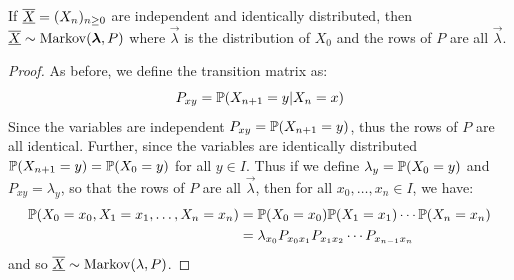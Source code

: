 \documentclass[../main.tex]{subfiles}
\begin{document}
\begin{corollary}
  If $\mchain{X} = (X_n)_{n \geq 0}$ are independent and identically distributed, then $\mchain{X} \sim \markov(\vec{\lambda}, P)$ where $\vec{\lambda}$ is the distribution of $X_0$ and the rows of $P$ are all $\vec{\lambda}$.
\end{corollary}
\begin{proof}
  As before, we define the transition matrix as:
  \[
    P_{x y} = \P(X_{n + 1} = y \vert X_n = x)
  \]
  Since the variables are independent $P_{x y} = \P(X_{n + 1} = y)$, thus the rows of $P$ are all identical.
  Further, since the variables are identically distributed $\P(X_{n + 1} = y) = \P(X_0 = y)$ for all $y \in I$.
  Thus if we define $\lambda_y = \P(X_0 = y)$ and $P_{x y} = \lambda_y$, so that the rows of $P$ are all $\vec{\lambda}$, then for all $x_0, \ldots, x_n \in I$, we have:
  \begin{align*}
    \P(X_0 = x_0, X_1 = x_1, \ldots, X_n = x_n) &= \P(X_0 = x_0) \P(X_1 = x_1) \cdots \P(X_n = x_n) \\
                                                &= \lambda_{x_0} P_{x_0 x_1} P_{x_1 x_2} \cdots P_{x_{n - 1} x_n}
  \end{align*}
  and so $\mchain{X} \sim \markov(\lambda, P)$.
\end{proof}
\end{document}
